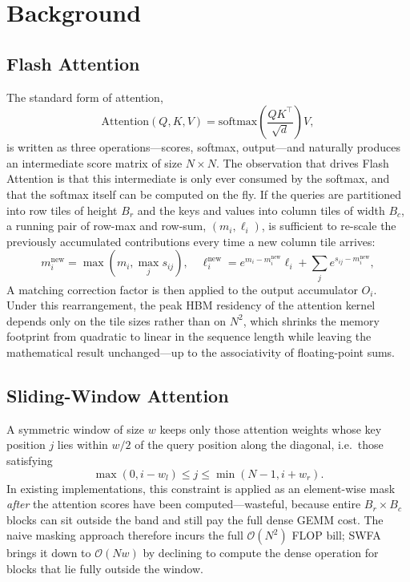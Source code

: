 \section{Background}\label{sec:swfa_background}

\subsection{Flash Attention}\label{sec:fa_bg}
The standard form of attention,
\begin{equation}
\mathrm{Attention}(Q, K, V) =
\mathrm{softmax}\!\left(\frac{Q K^{\!\top}}{\sqrt{d}}\right) V ,
\end{equation}
is written as three operations---scores, softmax, output---and
naturally produces an intermediate score matrix of size
$N \times N$. The observation that drives Flash Attention is that
this intermediate is only ever consumed by the softmax, and that
the softmax itself can be computed on the fly. If the queries are
partitioned into row tiles of height $B_r$ and the keys and values
into column tiles of width $B_c$, a running pair of row-max and
row-sum, $(m_i, \ell_i)$, is sufficient to re-scale the previously
accumulated contributions every time a new column tile arrives:
\begin{equation}\label{eq:online_softmax}
m_i^{\text{new}} = \max(m_i, \max_j s_{ij}),\quad
\ell_i^{\text{new}} = e^{m_i - m_i^{\text{new}}} \ell_i
                     + \sum_j e^{s_{ij} - m_i^{\text{new}}} ,
\end{equation}
A matching correction factor is then applied to the output
accumulator $O_i$. Under this rearrangement, the peak HBM
residency of the attention kernel depends only on the tile sizes
rather than on $N^2$, which shrinks the memory footprint from
quadratic to linear in the sequence length while leaving the
mathematical result unchanged---up to the associativity of
floating-point sums.

\subsection{Sliding-Window Attention}\label{sec:sw_bg}
A symmetric window of size $w$ keeps only those attention weights
whose key position $j$ lies within $w/2$ of the query position
along the diagonal, i.e.\ those satisfying
\begin{equation}\label{eq:window}
\max(0, i - w_l) \leq j \leq \min(N-1, i + w_r).
\end{equation}
In existing implementations, this constraint is applied as an
element-wise mask \emph{after} the attention scores have been
computed---wasteful, because entire $B_r \times B_c$ blocks can
sit outside the band and still pay the full dense GEMM cost. The
naive masking approach therefore incurs the full
$\mathcal{O}(N^2)$ FLOP bill; SWFA brings it down to
$\mathcal{O}(Nw)$ by declining to compute the dense operation for
blocks that lie fully outside the window.

